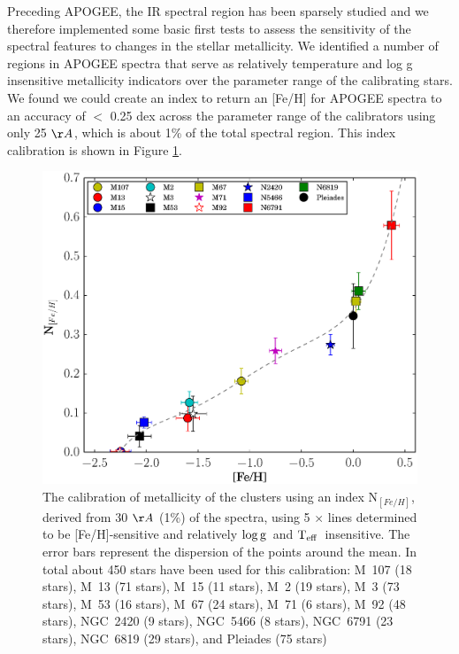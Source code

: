 \documentclass[12pt, preprint]{aastex}
\newcommand{\teff}{\mbox{$\rm T_{eff}$}}
\newcommand{\logg}{\mbox{$\rm \log g$}}
\begin{document}
Preceding APOGEE, the IR spectral region has been sparsely studied and we therefore implemented some basic first tests to assess the sensitivity of the spectral features to changes in the stellar metallicity.  We identified a number of regions in APOGEE spectra that serve as relatively temperature and log g insensitive metallicity indicators over the parameter range of the calibrating stars. We found we could create an index to return an [Fe/H] for APOGEE spectra to an accuracy of $<$ 0.25 dex across the parameter range of the calibrators using only 25 $\AA$, which is about 1\% of the total spectral region. This index calibration is shown in Figure \ref{fig:index}.

\begin{figure}[h!]
  \includegraphics[scale=0.5]{./plots/metals_index.eps}
\caption{The calibration of metallicity of the clusters using an index N$_{[Fe/H]}$, derived from 30 $\AA$ (1\%) of the spectra, using 5 $\times$ lines determined to be [Fe/H]-sensitive and relatively \logg\ and \teff\ insensitive. The error bars represent the dispersion of the points
  around the mean. In total about 450  stars have been used for this
  calibration: M~107 (18 stars), M~13 (71 stars), M~15 (11 stars), M~2
  (19 stars), M~3 (73 stars), M~53 (16 stars), M~67 (24 stars), M~71
  (6 stars), M~92 (48 stars), NGC~2420 (9 stars), NGC~5466 (8 stars),
  NGC~6791 (23 stars), NGC~6819 (29 stars), and Pleiades (75 stars) }%
\label{fig:index}
\end{figure}
\end{document}
